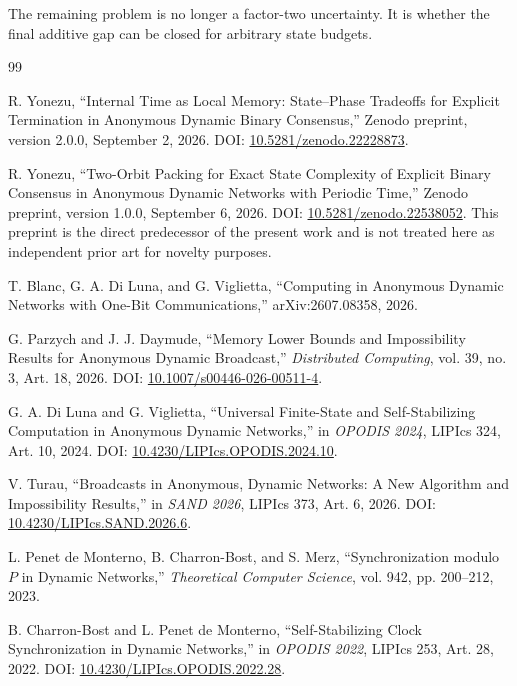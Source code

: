\documentclass[11pt]{article}
\theoremstyle{remark}
\begin{document}
The remaining problem is no longer a factor-two uncertainty.  It is whether the final
additive gap can be closed for arbitrary state budgets.

\begin{thebibliography}{99}

R. Yonezu,
``Internal Time as Local Memory: State--Phase Tradeoffs for Explicit Termination in Anonymous Dynamic Binary Consensus,''
Zenodo preprint, version 2.0.0, September 2, 2026.
DOI: \href{https://doi.org/10.5281/zenodo.22228873}{10.5281/zenodo.22228873}.

R. Yonezu,
``Two-Orbit Packing for Exact State Complexity of Explicit Binary Consensus in Anonymous Dynamic Networks with Periodic Time,''
Zenodo preprint, version 1.0.0, September 6, 2026.
DOI: \href{https://doi.org/10.5281/zenodo.22538052}{10.5281/zenodo.22538052}.
This preprint is the direct predecessor of the present work and is not treated here as
independent prior art for novelty purposes.

T. Blanc, G. A. Di Luna, and G. Viglietta,
``Computing in Anonymous Dynamic Networks with One-Bit Communications,''
arXiv:2607.08358, 2026.

G. Parzych and J. J. Daymude,
``Memory Lower Bounds and Impossibility Results for Anonymous Dynamic Broadcast,''
\emph{Distributed Computing}, vol. 39, no. 3, Art. 18, 2026.
DOI: \href{https://doi.org/10.1007/s00446-026-00511-4}{10.1007/s00446-026-00511-4}.

G. A. Di Luna and G. Viglietta,
``Universal Finite-State and Self-Stabilizing Computation in Anonymous Dynamic Networks,''
in \emph{OPODIS 2024}, LIPIcs 324, Art. 10, 2024.
DOI: \href{https://doi.org/10.4230/LIPIcs.OPODIS.2024.10}{10.4230/LIPIcs.OPODIS.2024.10}.

V. Turau,
``Broadcasts in Anonymous, Dynamic Networks: A New Algorithm and Impossibility Results,''
in \emph{SAND 2026}, LIPIcs 373, Art. 6, 2026.
DOI: \href{https://doi.org/10.4230/LIPIcs.SAND.2026.6}{10.4230/LIPIcs.SAND.2026.6}.

L. Penet de Monterno, B. Charron-Bost, and S. Merz,
``Synchronization modulo $P$ in Dynamic Networks,''
\emph{Theoretical Computer Science}, vol. 942, pp. 200--212, 2023.

B. Charron-Bost and L. Penet de Monterno,
``Self-Stabilizing Clock Synchronization in Dynamic Networks,''
in \emph{OPODIS 2022}, LIPIcs 253, Art. 28, 2022.
DOI: \href{https://doi.org/10.4230/LIPIcs.OPODIS.2022.28}{10.4230/LIPIcs.OPODIS.2022.28}.

\end{thebibliography}
\end{document}
